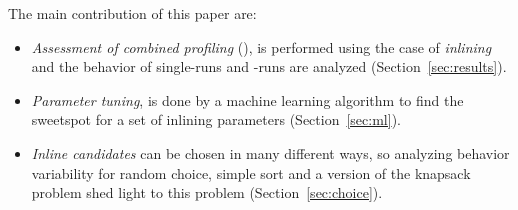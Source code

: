 The main contribution of this paper are:
\begin{itemize}
\item {\it Assessment of combined profiling} (\CP), is performed using
  the case of {\it inlining} and the behavior of single-runs and \CP-runs
  are analyzed (Section~\ref{sec:results}).

\item {\it Parameter tuning}, is done by a machine learning algorithm to find the 
  sweetspot for a set of inlining parameters (Section~\ref{sec:ml}).

\item {\it Inline candidates} can be chosen in many different ways, so
  analyzing behavior variability for random choice, simple sort and
  a version of the knapsack problem shed light to this problem (Section~\ref{sec:choice}).

\end{itemize}

